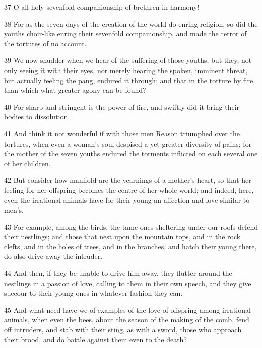 \par 37 O all-holy sevenfold companionship of brethren in harmony!

\par 38 For as the seven days of the creation of the world do enring religion, so did the youths choir-like enring their sevenfold companionship, and made the terror of the tortures of no account.

\par 39 We now shudder when we hear of the suffering of those youths; but they, not only seeing it with their eyes, nor merely hearing the spoken, imminent threat, but actually feeling the pang, endured it through; and that in the torture by fire, than which what greater agony can be found?

\par 40 For sharp and stringent is the power of fire, and swiftly did it bring their bodies to dissolution.

\par 41 And think it not wonderful if with those men Reason triumphed over the tortures, when even a woman's soul despised a yet greater diversity of pains; for the mother of the seven youths endured the torments inflicted on each several one of her children.

\par 42 But consider how manifold are the yearnings of a mother's heart, so that her feeling for her offspring becomes the centre of her whole world; and indeed, here, even the irrational animals have for their young an affection and love similar to men's.

\par 43 For example, among the birds, the tame ones sheltering under our roofs defend their nestlings; and those that nest upon the mountain tops, and in the rock clefts, and in the holes of trees, and in the branches, and hatch their young there, do also drive away the intruder.

\par 44 And then, if they be unable to drive him away, they flutter around the nestlings in a passion of love, calling to them in their own speech, and they give succour to their young ones in whatever fashion they can.

\par 45 And what need have we of examples of the love of offspring among irrational animals, when even the bees, about the season of the making of the comb, fend off intruders, and stab with their sting, as with a sword, those who approach their brood, and do battle against them even to the death?

